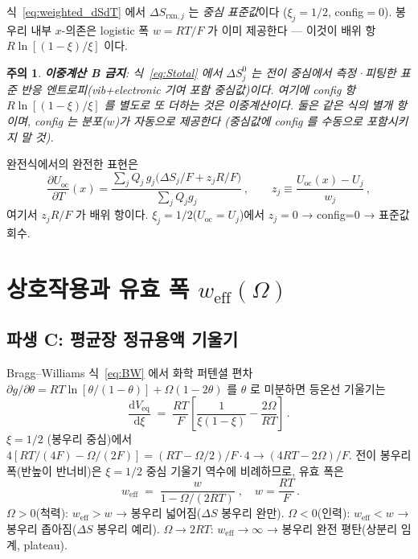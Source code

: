 \documentclass[11pt,a4paper]{article}
\newtheorem*{warnbox}{주의}
\newcommand{\dd}{\mathrm{d}}
\newcommand{\rxn}{\mathrm{rxn}}
\newcommand{\eq}{\mathrm{eq}}
\newcommand{\oc}{\mathrm{oc}}
\newcommand{\eff}{\mathrm{eff}}
\begin{document}
식~\eqref{eq:weighted_dSdT} 에서 $\Delta S_{\rxn,j}$ 는 \emph{중심 표준값}이다
($\xi_j=1/2$, config$=0$).
봉우리 내부 $x$-의존은 logistic 폭 $w=RT/F$ 가 이미 제공한다 --- 이것이 배위 항
$R\ln[(1-\xi)/\xi]$ 이다.

\begin{warnbox}
\textbf{이중계산 B 금지}: 식~\eqref{eq:Stotal} 에서 $\Delta S^0_j$ 는 전이 중심에서
측정·피팅한 표준 반응 엔트로피(vib+electronic 기여 포함 중심값)이다. 여기에 config
항 $R\ln[(1-\xi)/\xi]$ 를 \emph{별도로 또 더하는 것}은 이중계산이다.
둘은 같은 식의 별개 항이며, config 는 분포($w$)가 자동으로 제공한다
(중심값에 config 를 수동으로 포함시키지 말 것).
\end{warnbox}

완전식에서의 완전한 표현은
\begin{equation}
  \frac{\partial U_\oc}{\partial T}(x)
  = \frac{\sum_j Q_j\,g_j\bigl(\Delta S_j/F + z_j R/F\bigr)}{\sum_j Q_j g_j}\,,
  \qquad z_j \equiv \frac{U_\oc(x)-U_j}{w_j}\,,
  \label{eq:full_dUdT}
\end{equation}
여기서 $z_j R/F$ 가 배위 항이다. $\xi_j=1/2$($U_\oc=U_j$)에서 $z_j=0$ → config=0 → 표준값 회수.

\section{상호작용과 유효 폭 $w_\eff(\Omega)$}\label{sec:weff}

\subsection{파생 C: 평균장 정규용액 기울기}

Bragg--Williams 식~\eqref{eq:BW} 에서 화학 퍼텐셜 편차
$\partial g/\partial\theta=RT\ln[\theta/(1-\theta)]+\Omega(1-2\theta)$ 를 $\theta$ 로
미분하면 등온선 기울기는
\begin{equation}
  \frac{\dd V_\eq}{\dd\xi} \;=\; \frac{RT}{F}\left[\frac{1}{\xi(1-\xi)}-\frac{2\Omega}{RT}\right]\,.
  \label{eq:iso_slope}
\end{equation}
$\xi=1/2$ (봉우리 중심)에서 $4[RT/(4F)-\Omega/(2F)]=(RT-\Omega/2)/F\cdot4 \to (4RT-2\Omega)/F$.
전이 봉우리 폭(반높이 반너비)은 $\xi=1/2$ 중심 기울기 역수에 비례하므로, 유효 폭은
\begin{equation}
  \boxed{\;w_\eff \;=\; \frac{w}{1-\Omega/(2RT)}\;,\quad w=\frac{RT}{F}\,.}
  \label{eq:weff}
\end{equation}
$\Omega>0$(척력): $w_\eff>w$ → 봉우리 넓어짐($\Delta S$ 봉우리 완만).
$\Omega<0$(인력): $w_\eff<w$ → 봉우리 좁아짐($\Delta S$ 봉우리 예리).
$\Omega\to2RT$: $w_\eff\to\infty$ → 봉우리 완전 평탄(상분리 임계, plateau).
\end{document}
